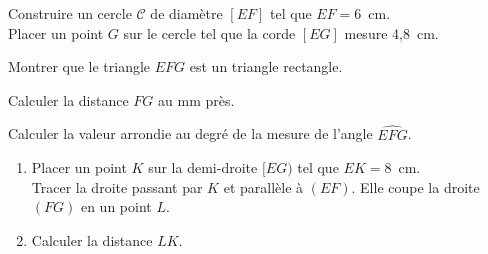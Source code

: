 \begin{myenumerate}
  \item Construire un cercle $\mathscr C$ de diamètre $[EF]$ tel que $EF=6$~cm.\\Placer un point $G$ sur le cercle tel que la corde $[EG]$ mesure 4,8~cm.
  \item Montrer que le triangle $EFG$ est un triangle rectangle.
  \item Calculer la distance $FG$ au mm près.
  \item Calculer la valeur arrondie au degré de la mesure de l'angle $\widehat{EFG}$.
  \item
    \begin{enumerate}
    \item Placer un point $K$ sur la demi-droite $[EG)$ tel que
      $EK=8$~cm.\\Tracer la droite passant par $K$ et parallèle à
      $(EF)$. Elle coupe la droite $(FG)$  en un point $L$.
    \item Calculer la distance $LK$.
    \end{enumerate}
\end{myenumerate}